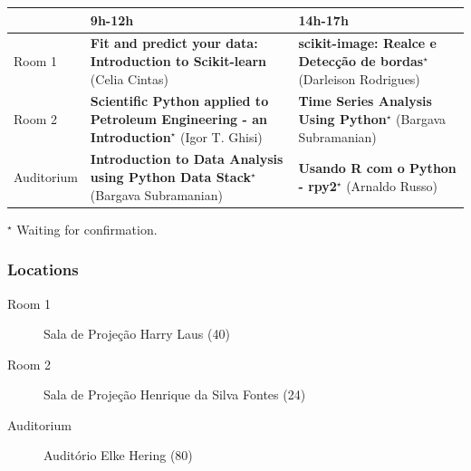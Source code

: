 \documentclass[12pt]{article}
\begin{document}
\begin{center}
   {\footnotesize{%
     \begin{tabular}{@{}l p{5cm} p{5cm}@{}}
     \toprule
      & 9h-12h & 14h-17h\\\midrule
     Room 1 & \textbf{Fit and predict your data: Introduction to Scikit-learn} (Celia Cintas) & \textbf{scikit-image: Realce e Detecção de bordas$^\star$} (Darleison Rodrigues)\\
     Room 2 & \textbf{Scientific Python applied to Petroleum Engineering - an Introduction$^\star$} (Igor T. Ghisi) & \textbf{Time Series Analysis Using Python$^\star$} (Bargava Subramanian)\\
     Auditorium & \textbf{Introduction to Data Analysis using Python Data Stack$^\star$} (Bargava Subramanian) & \textbf{Usando R com o Python - rpy2$^\star$} (Arnaldo Russo)\\\bottomrule
   \end{tabular}
 }}
\end{center}
{\footnotesize{$^\star$ Waiting for confirmation.}}

\subsubsection*{Locations}
{\footnotesize{%
\begin{description}
   \item[Room 1] Sala de Projeção Harry Laus (40)
   \item[Room 2] Sala de Projeção Henrique da Silva Fontes (24)
   \item[Auditorium] Auditório Elke Hering (80)
\end{description}
}}
\end{document}

